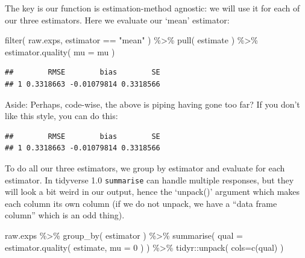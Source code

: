 \documentclass[
]{book}
\newenvironment{Shaded}{\begin{snugshade}}{\end{snugshade}}
\newcommand{\AttributeTok}[1]{\textcolor[rgb]{0.77,0.63,0.00}{#1}}
\newcommand{\DecValTok}[1]{\textcolor[rgb]{0.00,0.00,0.81}{#1}}
\newcommand{\FunctionTok}[1]{\textcolor[rgb]{0.00,0.00,0.00}{#1}}
\newcommand{\NormalTok}[1]{#1}
\newcommand{\SpecialCharTok}[1]{\textcolor[rgb]{0.00,0.00,0.00}{#1}}
\newcommand{\StringTok}[1]{\textcolor[rgb]{0.31,0.60,0.02}{#1}}
\begin{document}
The key is our function is estimation-method agnostic: we will use it for each of our three estimators.
Here we evaluate our `mean' estimator:

\begin{Shaded}
\begin{Highlighting}[]
\FunctionTok{filter}\NormalTok{( raw.exps, estimator }\SpecialCharTok{==} \StringTok{"mean"}\NormalTok{ ) }\SpecialCharTok{\%\textgreater{}\%}
    \FunctionTok{pull}\NormalTok{( estimate ) }\SpecialCharTok{\%\textgreater{}\%}
    \FunctionTok{estimator.quality}\NormalTok{( }\AttributeTok{mu =}\NormalTok{ mu )}
\end{Highlighting}
\end{Shaded}

\begin{verbatim}
##        RMSE        bias        SE
## 1 0.3318663 -0.01079814 0.3318566
\end{verbatim}

Aside: Perhaps, code-wise, the above is piping having gone too far? If you don't like this style, you can do
this:

\begin{Shaded}
\end{Shaded}

\begin{verbatim}
##        RMSE        bias        SE
## 1 0.3318663 -0.01079814 0.3318566
\end{verbatim}

To do all our three estimators, we group by estimator and evaluate for each
estimator. In tidyverse 1.0 \texttt{summarise} can handle multiple responses, but they
will look a bit weird in our output, hence the `unpack()' argument which
makes each column its own column (if we do not unpack, we have a ``data frame
column'' which is an odd thing).

\begin{Shaded}
\begin{Highlighting}[]
\NormalTok{raw.exps }\SpecialCharTok{\%\textgreater{}\%}
    \FunctionTok{group\_by}\NormalTok{( estimator ) }\SpecialCharTok{\%\textgreater{}\%}
    \FunctionTok{summarise}\NormalTok{( }\AttributeTok{qual =} \FunctionTok{estimator.quality}\NormalTok{( estimate, }\AttributeTok{mu =} \DecValTok{0}\NormalTok{ ) ) }\SpecialCharTok{\%\textgreater{}\%}
\NormalTok{    tidyr}\SpecialCharTok{::}\FunctionTok{unpack}\NormalTok{( }\AttributeTok{cols=}\FunctionTok{c}\NormalTok{(qual) )}
\end{Highlighting}
\end{Shaded}
\end{document}

